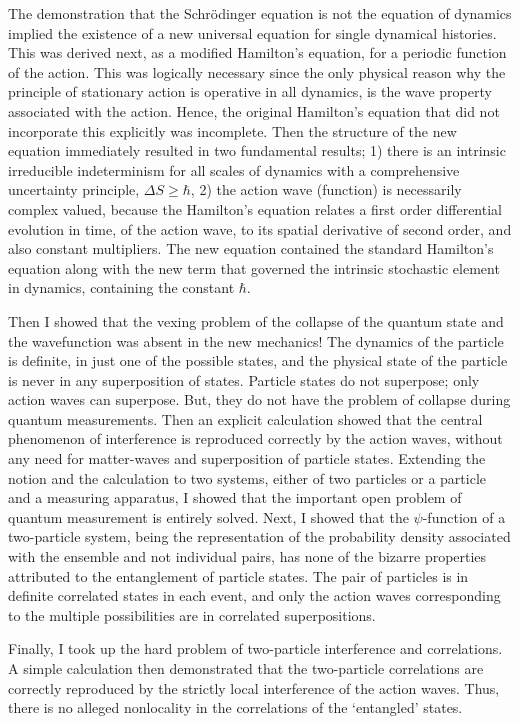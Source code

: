 The demonstration that the Schrödinger equation is not the equation of dynamics implied
the existence of a new universal equation for single dynamical histories. This was derived
next, as a modified Hamilton's equation, for a periodic function of the action. This was
logically necessary since the only physical reason why the principle of stationary action
is operative in all dynamics, is the wave property associated with the action. Hence, the
original Hamilton's equation that did not incorporate this explicitly was incomplete. Then
the structure of the new equation immediately resulted in two fundamental results; 1) there
is an intrinsic irreducible indeterminism for all scales of dynamics with a comprehensive
uncertainty principle, $\Delta S \geq  \hbar$, 2) the action wave (function) is necessarily complex valued,
because the Hamilton's equation relates a first order differential evolution in time, of the
action wave, to its spatial derivative of second order, and also constant multipliers. The
new equation contained the standard Hamilton's equation along with the new term that
governed the intrinsic stochastic element in dynamics, containing the constant $\hbar$.

Then I showed that the vexing problem of the collapse of the quantum state and the
wavefunction was absent in the new mechanics! The dynamics of the particle is definite, in
just one of the possible states, and the physical state of the particle is never in any superposition of states. Particle states do not superpose; only action waves can superpose. But, they do not have the problem of collapse during quantum measurements. Then an explicit
calculation showed that the central phenomenon of interference is reproduced correctly by
the action waves, without any need for matter-waves and superposition of particle states.
Extending the notion and the calculation to two systems, either of two particles or a particle and a measuring apparatus, I showed that the important open problem of quantum
measurement is entirely solved. Next, I showed that the $\psi$-function of a two-particle system, being the representation of the probability density associated with the ensemble and not individual pairs, has none of the bizarre properties attributed to the entanglement of
particle states. The pair of particles is in definite correlated states in each event, and only
the action waves corresponding to the multiple possibilities are in correlated superpositions.

Finally, I took up the hard problem of two-particle interference and correlations. A simple
calculation then demonstrated that the two-particle correlations are correctly reproduced by
the strictly local interference of the action waves. Thus, there is no alleged nonlocality in
the correlations of the `entangled' states.

